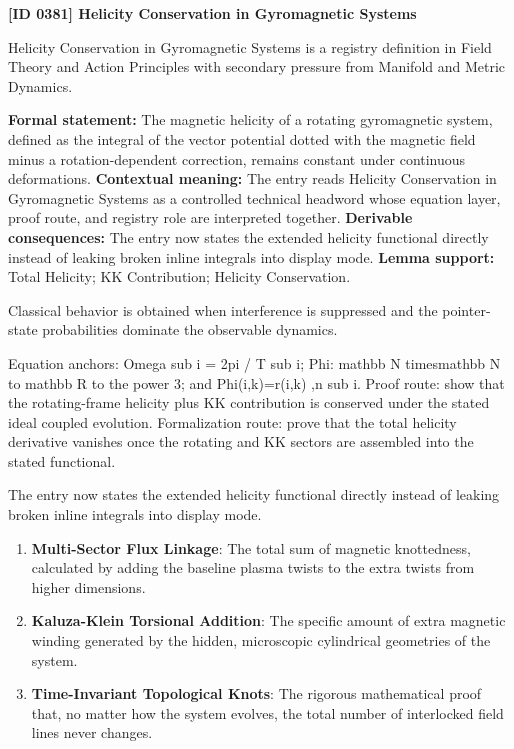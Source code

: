 \clearpage
\noindent\textbf{[ID 0381] Helicity Conservation in Gyromagnetic Systems}\par
\vspace{0.35em}
\begingroup\small
{}
Helicity Conservation in Gyromagnetic Systems is a registry definition in Field Theory and Action Principles with secondary pressure from Manifold and Metric Dynamics.

\begingroup\footnotesize\setlength{\emergencystretch}{3em}\sloppy
\textbf{Formal statement:} The magnetic helicity of a rotating gyromagnetic system, defined as the integral of the vector potential dotted with the magnetic field minus a rotation-dependent correction, remains constant under continuous deformations. \textbf{Contextual meaning:} The entry reads Helicity Conservation in Gyromagnetic Systems as a controlled technical headword whose equation layer, proof route, and registry role are interpreted together. \textbf{Derivable consequences:} The entry now states the extended helicity functional directly instead of leaking broken inline integrals into display mode. \textbf{Lemma support:} Total Helicity; KK Contribution; Helicity Conservation.\par
\endgroup

Classical behavior is obtained when interference is suppressed and the pointer-state probabilities dominate the observable dynamics.

Equation anchors: Omega sub i = 2pi / T sub i; Phi: mathbb N timesmathbb N to mathbb R to the power 3; and Phi(i,k)=r(i,k) ,n sub i. Proof route: show that the rotating-frame helicity plus KK contribution is conserved under the stated ideal coupled evolution. Formalization route: prove that the total helicity derivative vanishes once the rotating and KK sectors are assembled into the stated functional.

The entry now states the extended helicity functional directly instead of leaking broken inline integrals into display mode.
\endgroup

\begin{enumerate}[leftmargin=1.6em,itemsep=6pt,topsep=4pt]
\item \textbf{Multi-Sector Flux Linkage}: The total sum of magnetic knottedness, calculated by adding the baseline plasma twists to the extra twists from higher dimensions.
\item \textbf{Kaluza-Klein Torsional Addition}: The specific amount of extra magnetic winding generated by the hidden, microscopic cylindrical geometries of the system.
\item \textbf{Time-Invariant Topological Knots}: The rigorous mathematical proof that, no matter how the system evolves, the total number of interlocked field lines never changes.
\end{enumerate}

